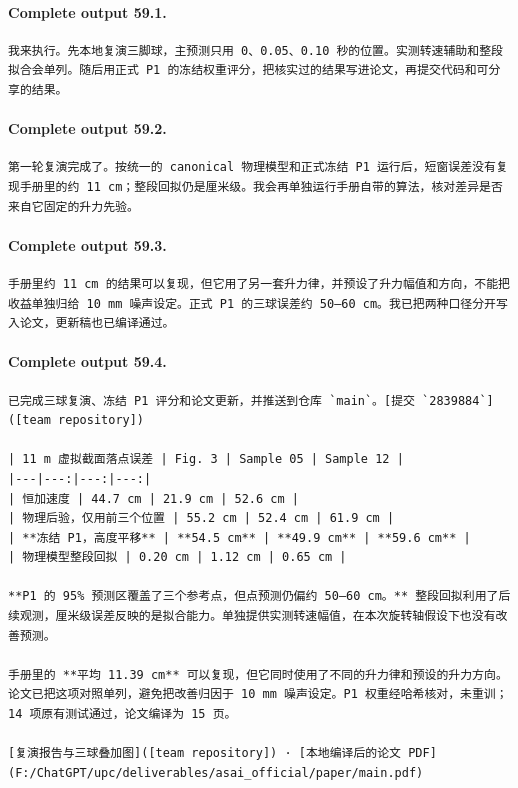 \documentclass[UTF8,10pt]{ctexart}
\begin{document}
\paragraph{Complete output 59.1.}
\begin{Verbatim}[breaklines=true,breakanywhere=true,fontsize=\scriptsize,frame=single,framesep=2pt]
我来执行。先本地复演三脚球，主预测只用 0、0.05、0.10 秒的位置。实测转速辅助和整段拟合会单列。随后用正式 P1 的冻结权重评分，把核实过的结果写进论文，再提交代码和可分享的结果。
\end{Verbatim}

\paragraph{Complete output 59.2.}
\begin{Verbatim}[breaklines=true,breakanywhere=true,fontsize=\scriptsize,frame=single,framesep=2pt]
第一轮复演完成了。按统一的 canonical 物理模型和正式冻结 P1 运行后，短窗误差没有复现手册里的约 11 cm；整段回拟仍是厘米级。我会再单独运行手册自带的算法，核对差异是否来自它固定的升力先验。
\end{Verbatim}

\paragraph{Complete output 59.3.}
\begin{Verbatim}[breaklines=true,breakanywhere=true,fontsize=\scriptsize,frame=single,framesep=2pt]
手册里约 11 cm 的结果可以复现，但它用了另一套升力律，并预设了升力幅值和方向，不能把收益单独归给 10 mm 噪声设定。正式 P1 的三球误差约 50–60 cm。我已把两种口径分开写入论文，更新稿也已编译通过。
\end{Verbatim}

\paragraph{Complete output 59.4.}
\begin{Verbatim}[breaklines=true,breakanywhere=true,fontsize=\scriptsize,frame=single,framesep=2pt]
已完成三球复演、冻结 P1 评分和论文更新，并推送到仓库 `main`。[提交 `2839884`]([team repository])

| 11 m 虚拟截面落点误差 | Fig. 3 | Sample 05 | Sample 12 |
|---|---:|---:|---:|
| 恒加速度 | 44.7 cm | 21.9 cm | 52.6 cm |
| 物理后验，仅用前三个位置 | 55.2 cm | 52.4 cm | 61.9 cm |
| **冻结 P1，高度平移** | **54.5 cm** | **49.9 cm** | **59.6 cm** |
| 物理模型整段回拟 | 0.20 cm | 1.12 cm | 0.65 cm |

**P1 的 95% 预测区覆盖了三个参考点，但点预测仍偏约 50–60 cm。** 整段回拟利用了后续观测，厘米级误差反映的是拟合能力。单独提供实测转速幅值，在本次旋转轴假设下也没有改善预测。

手册里的 **平均 11.39 cm** 可以复现，但它同时使用了不同的升力律和预设的升力方向。论文已把这项对照单列，避免把改善归因于 10 mm 噪声设定。P1 权重经哈希核对，未重训；14 项原有测试通过，论文编译为 15 页。

[复演报告与三球叠加图]([team repository]) · [本地编译后的论文 PDF](F:/ChatGPT/upc/deliverables/asai_official/paper/main.pdf)
\end{Verbatim}
\end{document}
